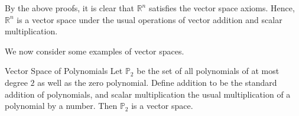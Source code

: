 \begin{solution}
By the above proofs, it is clear that $\mathbb{R}^n$ satisfies the vector space axioms. Hence, $\mathbb{R}^n$ is a vector space under the usual operations of vector addition and scalar multiplication. 
\end{solution}

We now consider some examples of vector spaces. 

\begin{example}{Vector Space of Polynomials}\label{exa:vectorspacepoly}
Let $\mathbb{P}_2$ be the set of all polynomials of at most degree $2$ as well as the zero polynomial. Define addition to be the standard addition of polynomials, and scalar multiplication the usual multiplication of a polynomial by a number. Then $\mathbb{P}_2$ is a vector space. 
\end{example}

